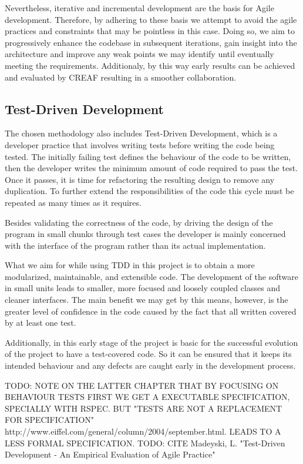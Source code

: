 Nevertheless, iterative and incremental development are the basis for Agile development. Therefore, by adhering to these basis we attempt to avoid the agile practices and constraints that may be pointless in this case. Doing so, we aim to progressively enhance the codebase in subsequent iterations, gain insight into the architecture and improve any weak points we may identify until eventually meeting the requirements. Additionaly, by this way early results can be achieved and evaluated by CREAF resulting in a smoother collaboration.

\subsection{Test-Driven Development}

The chosen methodology also includes Test-Driven Development, which is a developer practice that involves writing tests before writing the code being tested. The initially failing test defines the behaviour of the code to be written, then the developer writes the minimum amount of code required to pass the test. Once it passes, it is time for refactoring the resulting design to remove any duplication. To further extend the responsibilities of the code this cycle must be repeated as many times as it requires.

Besides validating the correctness of the code, by driving the design of the program in small chunks through test cases the developer is mainly concerned with the interface of the program rather than its actual implementation.

What we aim for while using TDD in this project is to obtain a more modularized, maintainable, and extensible code. The development of the software in small units leads to smaller, more focused and loosely coupled classes and cleaner interfaces. The main benefit we may get by this means, however, is the greater level of confidence in the code caused by the fact that all written covered by at least one test.

Additionally, in this early stage of the project is basic for the successful evolution of the project to have a test-covered code. So it can be ensured that it keeps its intended behaviour and any defects are caught early in the development process.

TODO: NOTE ON THE LATTER CHAPTER THAT BY FOCUSING ON BEHAVIOUR TESTS FIRST WE GET A EXECUTABLE SPECIFICATION, SPECIALLY WITH RSPEC. BUT "TESTS ARE NOT A REPLACEMENT FOR SPECIFICATION" http://www.eiffel.com/general/column/2004/september.html. LEADS TO A LESS FORMAL SPECIFICATION.
TODO: CITE Madeyski, L. "Test-Driven Development - An Empirical Evaluation of Agile Practice"